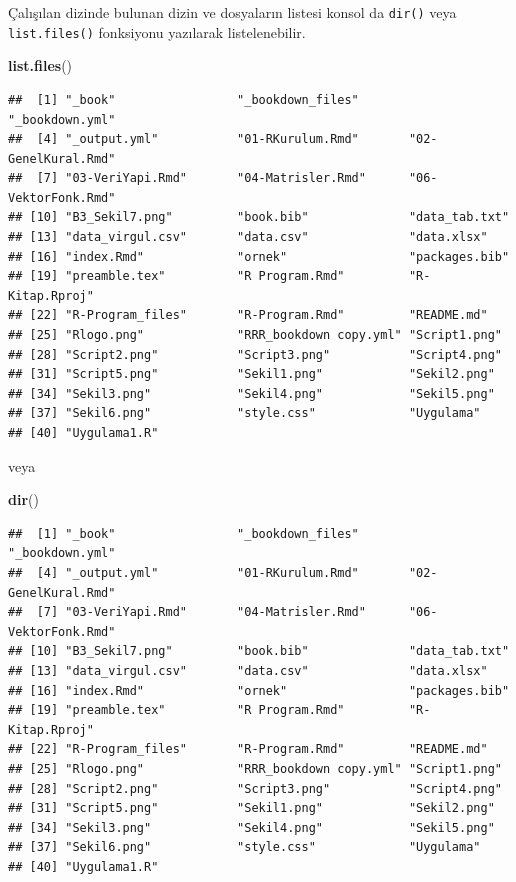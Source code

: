 \documentclass[
]{book}
\newenvironment{Shaded}{\begin{snugshade}}{\end{snugshade}}
\newcommand{\FunctionTok}[1]{\textcolor[rgb]{0.13,0.29,0.53}{\textbf{#1}}}
\newcommand{\NormalTok}[1]{#1}
\begin{document}
Çalışılan dizinde bulunan dizin ve dosyaların listesi konsol da \texttt{dir()} veya \texttt{list.files()} fonksiyonu yazılarak listelenebilir.

\begin{Shaded}
\begin{Highlighting}[]
\FunctionTok{list.files}\NormalTok{()}
\end{Highlighting}
\end{Shaded}

\begin{verbatim}
##  [1] "_book"                 "_bookdown_files"       "_bookdown.yml"        
##  [4] "_output.yml"           "01-RKurulum.Rmd"       "02-GenelKural.Rmd"    
##  [7] "03-VeriYapi.Rmd"       "04-Matrisler.Rmd"      "06-VektorFonk.Rmd"    
## [10] "B3_Sekil7.png"         "book.bib"              "data_tab.txt"         
## [13] "data_virgul.csv"       "data.csv"              "data.xlsx"            
## [16] "index.Rmd"             "ornek"                 "packages.bib"         
## [19] "preamble.tex"          "R Program.Rmd"         "R-Kitap.Rproj"        
## [22] "R-Program_files"       "R-Program.Rmd"         "README.md"            
## [25] "Rlogo.png"             "RRR_bookdown copy.yml" "Script1.png"          
## [28] "Script2.png"           "Script3.png"           "Script4.png"          
## [31] "Script5.png"           "Sekil1.png"            "Sekil2.png"           
## [34] "Sekil3.png"            "Sekil4.png"            "Sekil5.png"           
## [37] "Sekil6.png"            "style.css"             "Uygulama"             
## [40] "Uygulama1.R"
\end{verbatim}

veya

\begin{Shaded}
\begin{Highlighting}[]
\FunctionTok{dir}\NormalTok{()}
\end{Highlighting}
\end{Shaded}

\begin{verbatim}
##  [1] "_book"                 "_bookdown_files"       "_bookdown.yml"        
##  [4] "_output.yml"           "01-RKurulum.Rmd"       "02-GenelKural.Rmd"    
##  [7] "03-VeriYapi.Rmd"       "04-Matrisler.Rmd"      "06-VektorFonk.Rmd"    
## [10] "B3_Sekil7.png"         "book.bib"              "data_tab.txt"         
## [13] "data_virgul.csv"       "data.csv"              "data.xlsx"            
## [16] "index.Rmd"             "ornek"                 "packages.bib"         
## [19] "preamble.tex"          "R Program.Rmd"         "R-Kitap.Rproj"        
## [22] "R-Program_files"       "R-Program.Rmd"         "README.md"            
## [25] "Rlogo.png"             "RRR_bookdown copy.yml" "Script1.png"          
## [28] "Script2.png"           "Script3.png"           "Script4.png"          
## [31] "Script5.png"           "Sekil1.png"            "Sekil2.png"           
## [34] "Sekil3.png"            "Sekil4.png"            "Sekil5.png"           
## [37] "Sekil6.png"            "style.css"             "Uygulama"             
## [40] "Uygulama1.R"
\end{verbatim}
\end{document}
